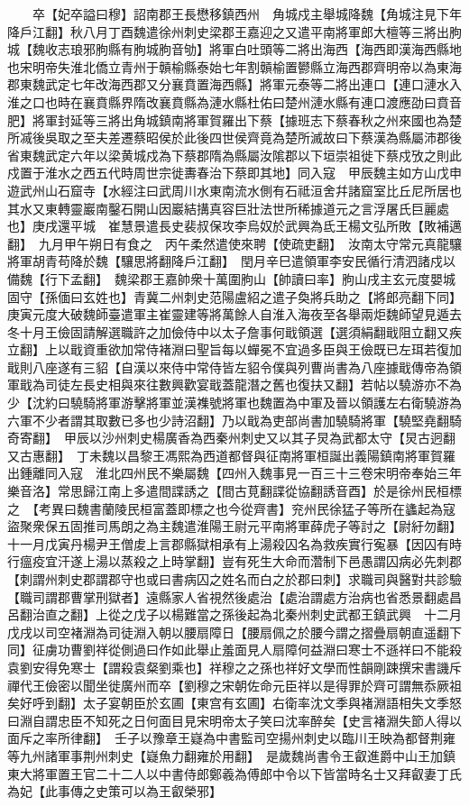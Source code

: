 　　卒【妃卒謚曰穆】詔南郡王長懋移鎮西州　角城戍主舉城降魏【角城注見下年降戶江翻】秋八月丁酉魏遣徐州刺史梁郡王嘉迎之又遣平南將軍郎大檀等三將出胊城【魏收志琅邪朐縣有胊城胊音劬】將軍白吐頭等二將出海西【海西即漢海西縣地也宋明帝失淮北僑立青州于贑榆縣泰始七年割贑榆置鬰縣立海西郡齊明帝以為東海郡東魏武定七年改海西郡又分襄賁置海西縣】將軍元泰等二將出連口【連口漣水入淮之口也時在襄賁縣界隋改襄賁縣為漣水縣杜佑曰楚州漣水縣有連口渡應劭曰賁音肥】將軍封延等三將出角城鎮南將軍賀羅出下蔡【據班志下蔡春秋之州來國也為楚所㓕後吳取之至夫差遷蔡昭侯於此後四世侯齊竟為楚所滅故曰下蔡漢為縣屬沛郡後省東魏武定六年以梁黄城戍為下蔡郡隋為縣屬汝隂郡以下垣崇祖徙下蔡戍攷之則此戍置于淮水之西五代時周世宗徙夀春治下蔡即其地】同入寇　甲辰魏主如方山戊申遊武州山石窟寺【水經注曰武周川水東南流水側有石祗洹舍幷諸窟室比丘尼所居也其水又東轉靈巖南鑿石開山因巖結搆真容巨壯法世所稀據道元之言浮屠氏巨麗處也】庚戌還平城　崔慧景遣長史裴叔保攻李烏奴於武興為氐王楊文弘所敗【敗補邁翻】　九月甲午朔日有食之　丙午柔然遣使來聘【使疏吏翻】　汝南太守常元真龍驤將軍胡青苟降於魏【驤思將翻降戶江翻】　閏月辛巳遣領軍李安民循行清泗諸戍以備魏【行下孟翻】　魏梁郡王嘉帥衆十萬圍朐山【帥讀曰率】胊山戌主玄元度嬰城固守【孫偭曰玄姓也】青冀二州刺史范陽盧紹之遣子奐將兵助之【將郎亮翻下同】庚寅元度大破魏師臺遣軍主崔靈建等將萬餘人自淮入海夜至各舉兩炬魏師望見遁去　冬十月王儉固請解選職許之加儉侍中以太子詹事何戢領選【選須絹翻戢阻立翻又疾立翻】上以戢資重欲加常侍褚淵曰聖旨每以蟬冕不宜過多臣與王儉既已左珥若復加戢則八座遂有三貂【自漢以來侍中常侍皆左貂令僕與列曹尚書為八座據戢傳帝為領軍戢為司徒左長史相與來往數興歡宴戢蓋龍潛之舊也復扶又翻】若帖以驍游亦不為少【沈約曰驍騎將軍游擊將軍並漢襍號將軍也魏置為中軍及晉以領護左右衛驍游為六軍不少者謂其取數已多也少詩沼翻】乃以戢為吏部尚書加驍騎將軍【驍堅堯翻騎奇寄翻】　甲辰以沙州刺史楊廣香為西秦州刺史又以其子炅為武都太守【炅古迥翻又古惠翻】　丁未魏以昌黎王馮熙為西道都督與征南將軍桓誕出義陽鎮南將軍賀羅出鍾離同入寇　淮北四州民不樂屬魏【四州入魏事見一百三十三卷宋明帝奉始三年樂音洛】常思歸江南上多遣間諜誘之【間古莧翻諜從協翻誘音酉】於是徐州民桓標之　【考異曰魏書蘭陵民桓富蓋即標之也今從齊書】兖州民徐猛子等所在蠭起為寇盜聚衆保五固推司馬朗之為主魏遣淮陽王尉元平南將軍薛虎子等討之【尉紆勿翻】　十一月戊寅丹楊尹王僧䖍上言郡縣獄相承有上湯殺囚名為救疾實行寃暴【因囚有時行瘟疫宜汗遂上湯以蒸殺之上時掌翻】豈有死生大命而濳制下邑愚謂囚病必先刺郡【刺謂州刺史郡謂郡守也或曰書病囚之姓名而白之於郡曰刺】求職司與醫對共診驗【職司謂郡曹掌刑獄者】遠縣家人省視然後處治【處治謂處方治病也省悉景翻處昌呂翻治直之翻】上從之戊子以楊難當之孫後起為北秦州刺史武都王鎮武興　十二月戊戌以司空褚淵為司徒淵入朝以腰扇障日【腰扇佩之於腰今謂之摺疊扇朝直遥翻下同】征虜功曹劉祥從側過曰作如此舉止羞面見人扇障何益淵曰寒士不遜祥曰不能殺袁劉安得免寒士【謂殺袁粲劉乘也】祥穆之之孫也祥好文學而性韻剛踈撰宋書譏斥禪代王儉密以聞坐徙廣州而卒【劉穆之宋朝佐命元臣祥以是得罪於齊可謂無忝厥祖矣好呼到翻】太子宴朝臣於玄圃【東宫有玄圃】右衛率沈文季與褚淵語相失文季怒曰淵自謂忠臣不知死之日何面目見宋明帝太子笑曰沈率醉矣【史言褚淵失節人得以面斥之率所律翻】　壬子以豫章王嶷為中書監司空揚州刺史以臨川王映為都督荆雍等九州諸軍事荆州刺史【嶷魚力翻雍於用翻】　是歲魏尚書令王叡進爵中山王加鎮東大將軍置王官二十二人以中書侍郎鄭羲為傅郎中令以下皆當時名士又拜叡妻丁氏為妃【此事傳之史策可以為王叡榮邪】

